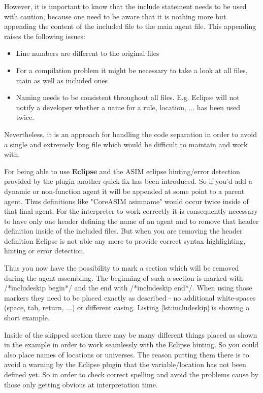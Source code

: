 However, it is important to know that the include statement needs to be used with caution, because one need to be aware that it is nothing more but appending the content of the included file to the main agent file. This appending raises the following issues:

\begin{itemize}
	\item Line numbers are different to the original files
	\item For a compilation problem it might be necessary to take a look at all files, main as well as included ones
	\item Naming needs to be consistent throughout all files. E.g. Eclipse will not notify a developer whether a name for a rule, location, ... has been used twice.
\end{itemize}

Nevertheless, it is an approach for handling the code separation in order to avoid a single and extremely long file which would be difficult to maintain and work with.

For being able to use \textbf{Eclipse} and the ASIM eclipse hinting/error detection provided by the plugin another quick fix has been introduced. So if you'd add a dynamic or non-function agent it will be appended at some point to a parent agent. Thus definitions like "CoreASIM asimname" would occur twice inside of that final agent. For the interpreter to work correctly it is consequently necessary to have only one header defining the name of an agent and to remove that header definition inside of the included files. But when you are removing the header definition Eclipse is not able any more to provide correct syntax highlighting, hinting or error detection.

Thus you now have the possibility to mark a section which will be removed during the agent assembling. The beginning of such a section is marked with \textcolor{eclipseComment}{/*includeskip begin*/} and the end with \textcolor{eclipseComment}{/*includeskip end*/}. When using those markers they need to be placed exactly as described - no additional white-spaces (space, tab, return, ...) or different casing. Listing \ref{lst:includeskip} is showing a short example.

Inside of the skipped section there may be many different things placed as shown in the example in order to work seamlessly with the Eclipse hinting. So you could also place names of locations or universes. The reason putting them there is to avoid a warning by the Eclipse plugin that the variable/location has not been defined yet. So in order to check correct spelling and avoid the problems cause by those only getting obvious at interpretation time.

